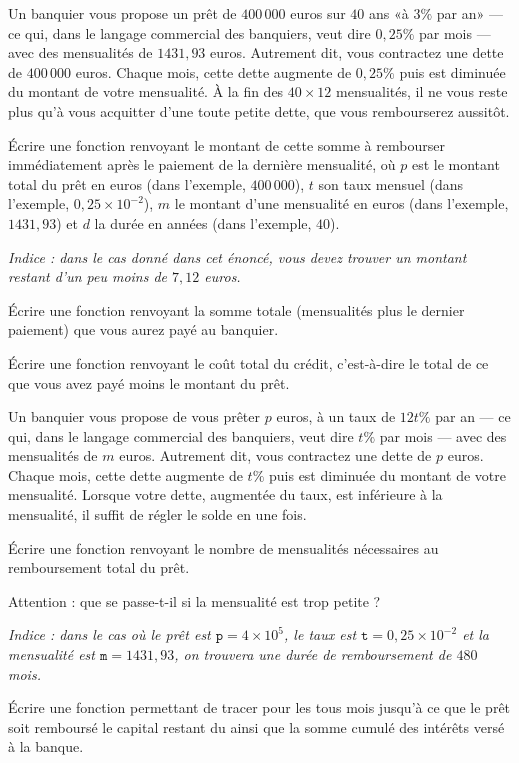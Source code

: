 Un banquier vous  propose un prêt de $400\,000$ euros  sur $40$ ans «à
$3\%$ par  an» ---  ce qui, dans  le langage commercial  des banquiers,
veut  dire $0,25\%$  par mois  ---  avec des  mensualités de  $1431,93$
euros.  Autrement  dit,  vous   contractez  une  dette  de  $400\,000$
euros. Chaque mois, cette dette  augmente de $0,25\%$ puis est diminuée
du  montant  de  votre  mensualité.  À  la  fin  des  $40  \times  12$
mensualités, il  ne vous  reste plus qu'à  vous acquitter  d'une toute
petite dette, que vous rembourserez aussitôt.


\question{} Écrire  une fonction  
renvoyant  le montant  de cette  somme à  rembourser  immédiatement
après le paiement de la dernière
mensualité, où  $p$ est le  montant total du  prêt en euros (dans l'exemple, $400\,000$), $t$ son  taux mensuel (dans l'exemple, 
$0,25 \times 10^{-2}$), $m$ le montant d'une mensualité en euros (dans l'exemple, $1431,93$) et $d$ la
durée en années (dans l'exemple, $40$).

\emph{Indice : dans le cas donné dans cet énoncé, vous devez trouver un montant
restant d'un peu moins de $7,12$ euros.}


\question{} Écrire une fonction  renvoyant la somme totale (mensualités plus le dernier
paiement) que vous aurez payé au banquier.


\question{}Écrire une fonction  renvoyant
  le coût total  du crédit, c'est-à-dire le total de  ce que vous avez
  payé moins le montant du prêt.
  
Un banquier vous propose de vous prêter $p$ euros, à un taux de $12t\%$ par an ---  ce qui, dans  le langage commercial  des banquiers,
veut  dire $t\%$  par mois  --- avec des  mensualités de  $m$ euros. Autrement  dit,  vous   contractez  une  dette  de  $p$
euros. Chaque mois, cette dette  augmente de $t\%$ puis est diminuée du  montant  de  votre  mensualité. Lorsque votre dette, augmentée du taux, est inférieure à la mensualité, il suffit de régler le solde en une fois.

\question{} \'Ecrire une fonction  renvoyant le nombre de mensualités nécessaires au remboursement total du prêt.

\question{} Attention : que se passe-t-il si la mensualité est trop petite ? 

\emph{Indice : dans le cas où le prêt est $\texttt{p}=4\times10^5$, le taux est $\texttt{t}=0,25\times10^{-2}$ et la mensualité est $\texttt{m}=1431,93$, on trouvera une durée de remboursement de $480$ mois.}

\question{} \'Ecrire une fonction  permettant de tracer pour les tous mois jusqu'à ce que le prêt soit remboursé le capital restant du ainsi que la somme cumulé des intérêts versé à la banque.
